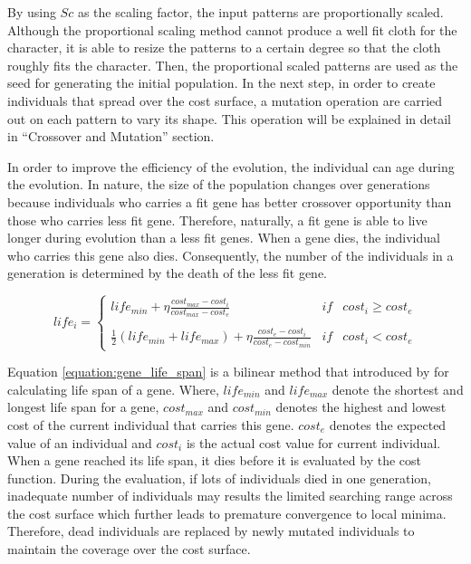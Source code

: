 By using $Sc$ as the scaling factor, the input patterns are proportionally scaled. Although the proportional scaling method cannot produce a well fit cloth for the character, it is able to resize the patterns to a certain degree so that the cloth roughly fits the character. Then, the proportional scaled patterns are used as the seed for generating the initial population. In the next step, in order to create individuals that spread over the cost surface, a mutation operation are carried out on each pattern to vary its shape. This operation will be explained in detail in ``Crossover and Mutation'' section.

In order to improve the efficiency of the evolution, the individual can age during the evolution. In nature, the size of the population changes over generations because individuals who carries a fit gene has better crossover opportunity than those who carries less fit gene. Therefore, naturally, a fit gene is able to live longer during evolution than a less fit genes. When a gene dies, the individual who carries this gene also dies. Consequently, the number of the individuals in a generation is determined by the death of the less fit gene. 

\begin{equation}
life_{i} = \left\{
\begin{matrix}
life_{min} + \eta \frac{cost_{max}-cost_{i}}{cost_{max}-cost_{e}}  & if & cost_{i} \geq  cost_{e}\\
\\
\frac{1}{2}(life_{min} + life_{max}) + \eta \frac{cost_{e} - cost_{i}}{cost_{e} - cost_{min}} & if& cost_{i}  <  cost_{e}
\end{matrix}\right.
\label{equation:gene_life_span}
\end{equation}

Equation \ref{equation:gene_life_span} is a bilinear method that introduced by  for calculating life span of a gene.  Where, $life_{min}$ and $life_{max}$ denote the shortest and longest life span for a gene, $cost_{max}$ and $cost_{min}$ denotes the highest and lowest cost of the current individual that carries this gene. $cost_{e}$ denotes the expected value of an individual and $cost_{i}$ is the actual cost value for current individual. When a gene reached its life span, it dies before it is evaluated by the cost function. During the evaluation, if lots of individuals died in one generation, inadequate number of individuals may results the limited searching range across the cost surface which further leads to premature convergence to local minima. Therefore, dead individuals are replaced by newly mutated individuals to maintain the coverage over the cost surface.

